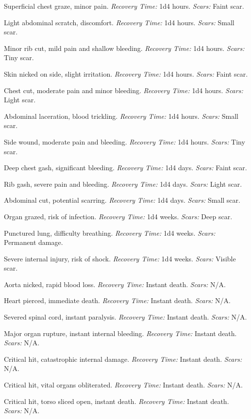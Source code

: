 \begin{description}[labelwidth=1.5em, leftmargin=*, itemsep=0.4em]
    \item[01 -] Superficial chest graze, minor pain. \textit{Recovery Time:} 1d4 hours. \textit{Scars:} Faint scar.
    \item[02 -] Light abdominal scratch, discomfort. \textit{Recovery Time:} 1d4 hours. \textit{Scars:} Small scar.
    \item[03 -] Minor rib cut, mild pain and shallow bleeding. \textit{Recovery Time:} 1d4 hours. \textit{Scars:} Tiny scar.
    \item[04 -] Skin nicked on side, slight irritation. \textit{Recovery Time:} 1d4 hours. \textit{Scars:} Faint scar.
    \item[05 -] Chest cut, moderate pain and minor bleeding. \textit{Recovery Time:} 1d4 hours. \textit{Scars:} Light scar.
    \item[06 -] Abdominal laceration, blood trickling. \textit{Recovery Time:} 1d4 hours. \textit{Scars:} Small scar.
    \item[07 -] Side wound, moderate pain and bleeding. \textit{Recovery Time:} 1d4 hours. \textit{Scars:} Tiny scar.
    \item[08 -] Deep chest gash, significant bleeding. \textit{Recovery Time:} 1d4 days. \textit{Scars:} Faint scar.
    \item[09 -] Rib gash, severe pain and bleeding. \textit{Recovery Time:} 1d4 days. \textit{Scars:} Light scar.
    \item[10 -] Abdominal cut, potential scarring. \textit{Recovery Time:} 1d4 days. \textit{Scars:} Small scar.
    \item[11 -] Organ grazed, risk of infection. \textit{Recovery Time:} 1d4 weeks. \textit{Scars:} Deep scar.
    \item[12 -] Punctured lung, difficulty breathing. \textit{Recovery Time:} 1d4 weeks. \textit{Scars:} Permanent damage.
    \item[13 -] Severe internal injury, risk of shock. \textit{Recovery Time:} 1d4 weeks. \textit{Scars:} Visible scar.
    \item[14 -] Aorta nicked, rapid blood loss. \textit{Recovery Time:} Instant death. \textit{Scars:} N/A.
    \item[15 -] Heart pierced, immediate death. \textit{Recovery Time:} Instant death. \textit{Scars:} N/A.
    \item[16 -] Severed spinal cord, instant paralysis. \textit{Recovery Time:} Instant death. \textit{Scars:} N/A.
    \item[17 -] Major organ rupture, instant internal bleeding. \textit{Recovery Time:} Instant death. \textit{Scars:} N/A.
    \item[18 -] Critical hit, catastrophic internal damage. \textit{Recovery Time:} Instant death. \textit{Scars:} N/A.
    \item[19 -] Critical hit, vital organs obliterated. \textit{Recovery Time:} Instant death. \textit{Scars:} N/A.
    \item[20 -] Critical hit, torso sliced open, instant death. \textit{Recovery Time:} Instant death. \textit{Scars:} N/A.
\end{description}


